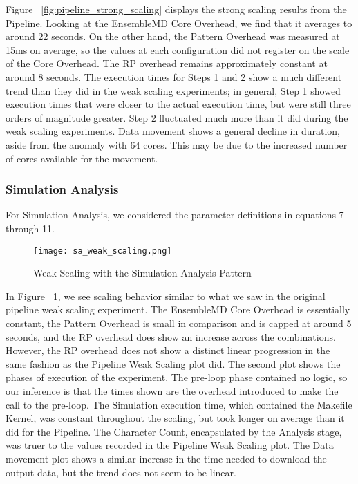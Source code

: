 \documentclass[]{article}
\begin{document}
			Figure ~\ref{fig:pipeline_strong_scaling} displays the strong scaling results from the Pipeline. Looking at the EnsembleMD Core Overhead, we find that it averages to around 22 seconds. On the other hand, the Pattern Overhead was measured at 15ms on average, so the values at each configuration did not register on the scale of the Core Overhead. The RP overhead remains approximately constant at around 8 seconds. The execution times for Steps 1 and 2 show a much different trend than they did in the weak scaling experiments; in general, Step 1 showed execution times that were closer to the actual execution time, but were still three orders of magnitude greater. Step 2 fluctuated much more than it did during the weak scaling experiments.
			Data movement shows a general decline in duration, aside from the anomaly with 64 cores. This may be due to the increased number of cores available for the movement.

		\pagebreak
		\subsubsection{Simulation Analysis}

			For Simulation Analysis, we considered the parameter definitions in equations 7 through 11.

			\begin{figure}[H]
				\centering
				\texttt{[image: sa\_weak\_scaling.png]}
				\caption{Weak Scaling with the Simulation Analysis Pattern}
				\label{fig:sa_weak_scaling}
			\end{figure}

			In Figure ~\ref{fig:sa_weak_scaling}, we see scaling behavior similar to what we saw in the original pipeline weak scaling experiment. The EnsembleMD Core Overhead is essentially constant, the Pattern Overhead is small in comparison and is capped at around 5 seconds, and the RP overhead does show an increase across the combinations. However, the RP overhead does not show a distinct linear progression in the same fashion as the Pipeline Weak Scaling plot did. 
			The second plot shows the phases of execution of the experiment. The pre-loop phase contained no logic, so our inference is that the times shown are the overhead introduced to make the call to the pre-loop. The Simulation execution time, which contained the Makefile Kernel, was constant throughout the scaling, but took longer on average than it did for the Pipeline. The Character Count, encapsulated by the Analysis stage, was truer to the values recorded in the Pipeline Weak Scaling plot.
			The Data movement plot shows a similar increase in the time needed to download the output data, but the trend does not seem to be linear. 
\end{document}
